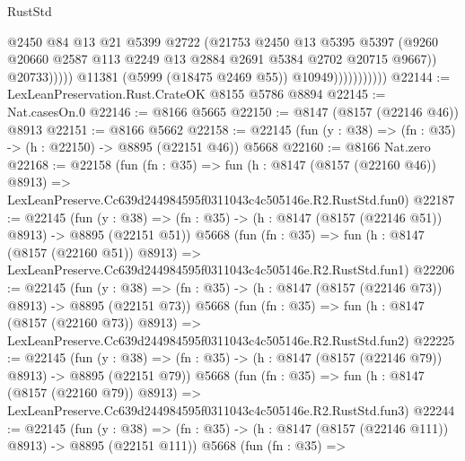 \begin{lexlean}{RustStd}
\begin{coremodule}
                                    @2450
                                    @84
                                    @13
                                    @21
                                    @5399
                                    @2722
                                    (@21753
                                      @2450
                                      @13
                                      @5395
                                      @5397
                                      (@9260
                                        @20660
                                        @2587
                                        @113
                                        @2249
                                        @13
                                        @2884
                                        @2691
                                        @5384
                                        @2702
                                        @20715
                                        @9667))
                                    @20733)))))
                          @11381
                          (@5999 (@18475 @2469 @55))
                          @10949)))))))))))
@22144 := LexLeanPreservation.Rust.CrateOK @8155 @5786 @8894
@22145 := Nat.casesOn.{0}
@22146 := @8166 @5665
@22150 := @8147 (@8157 (@22146 @46)) @8913
@22151 := @8166 @5662
@22158 := @22145 (fun (y : @38) => (fn : @35) -> (h : @22150) -> @8895 (@22151 @46)) @5668
@22160 := @8166 Nat.zero
@22168 := @22158
    (fun (fn : @35) =>
    fun (h : @8147 (@8157 (@22160 @46)) @8913) =>
    LexLeanPreserve.Cc639d244984595f0311043c4c505146e.R2.RustStd.fun0)
@22187 := @22145
    (fun (y : @38) => (fn : @35) -> (h : @8147 (@8157 (@22146 @51)) @8913) -> @8895 (@22151 @51))
    @5668
    (fun (fn : @35) =>
    fun (h : @8147 (@8157 (@22160 @51)) @8913) =>
    LexLeanPreserve.Cc639d244984595f0311043c4c505146e.R2.RustStd.fun1)
@22206 := @22145
    (fun (y : @38) => (fn : @35) -> (h : @8147 (@8157 (@22146 @73)) @8913) -> @8895 (@22151 @73))
    @5668
    (fun (fn : @35) =>
    fun (h : @8147 (@8157 (@22160 @73)) @8913) =>
    LexLeanPreserve.Cc639d244984595f0311043c4c505146e.R2.RustStd.fun2)
@22225 := @22145
    (fun (y : @38) => (fn : @35) -> (h : @8147 (@8157 (@22146 @79)) @8913) -> @8895 (@22151 @79))
    @5668
    (fun (fn : @35) =>
    fun (h : @8147 (@8157 (@22160 @79)) @8913) =>
    LexLeanPreserve.Cc639d244984595f0311043c4c505146e.R2.RustStd.fun3)
@22244 := @22145
    (fun (y : @38) => (fn : @35) -> (h : @8147 (@8157 (@22146 @111)) @8913) -> @8895 (@22151 @111))
    @5668
    (fun (fn : @35) =>

\end{coremodule}
\end{lexlean}
